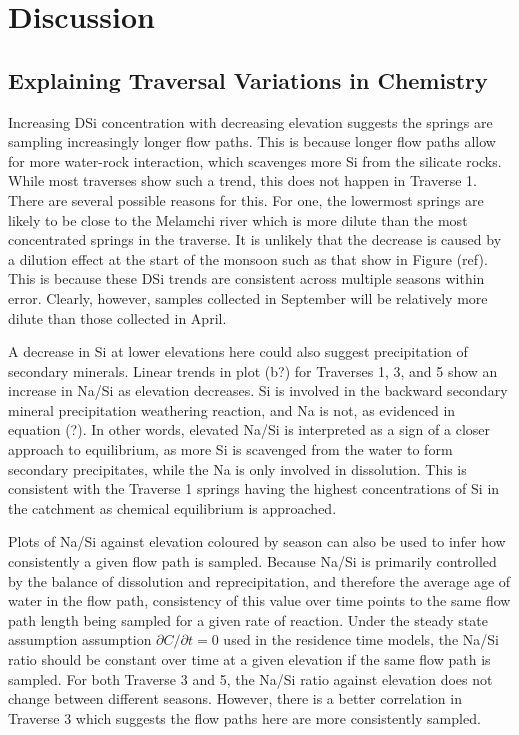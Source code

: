 

\section{Discussion}

\subsection{Explaining Traversal Variations in Chemistry}

Increasing DSi concentration with decreasing elevation suggests the springs are sampling increasingly longer flow paths. This is because longer flow paths allow for more water-rock interaction, which scavenges more Si from the silicate rocks. While most traverses show such a trend, this does not happen in Traverse 1. There are several possible reasons for this. For one, the lowermost springs are likely to be close to the Melamchi river which is more dilute than the most concentrated springs in the traverse. It is unlikely that the decrease is caused by a dilution effect at the start of the monsoon such as that show in Figure (ref). This is because these DSi trends are consistent across multiple seasons within error. Clearly, however, samples collected in September will be relatively more dilute than those collected in April.

\bsk

A decrease in Si at lower elevations here could also suggest precipitation of secondary minerals. Linear trends in plot (b?) for Traverses 1, 3, and 5 show an increase in Na/Si as elevation decreases. Si is involved in the backward secondary mineral precipitation weathering reaction, and Na is not, as evidenced in equation (?). In other words, elevated Na/Si is interpreted as a sign of a closer approach to equilibrium, as more Si is scavenged from the water to form secondary precipitates, while the Na is only involved in dissolution. This is consistent with the Traverse 1 springs having the highest concentrations of Si in the catchment as chemical equilibrium is approached. 

\bsk

Plots of Na/Si against elevation coloured by season can also be used to infer how consistently a given flow path is sampled. Because Na/Si is primarily controlled by the balance of dissolution and reprecipitation, and therefore the average age of water in the flow path, consistency of this value over time points to the same flow path length being sampled for a given rate of reaction. Under the steady state assumption assumption $\partial C/\partial t = 0$ used in the residence time models, the Na/Si ratio should be constant over time at a given elevation if the same flow path is sampled. For both Traverse 3 and 5, the Na/Si ratio against elevation does not change between different seasons. However, there is a better correlation in Traverse 3 which suggests the flow paths here are more consistently sampled.

